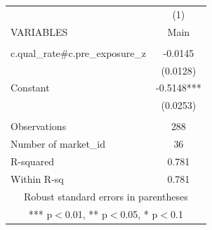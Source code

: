 \begin{tabular}{lc} \hline
 & (1) \\
VARIABLES & Main \\ \hline
 &  \\
c.qual\_rate\#c.pre\_exposure\_z & -0.0145 \\
 & (0.0128) \\
Constant & -0.5148*** \\
 & (0.0253) \\
 &  \\
Observations & 288 \\
Number of market\_id & 36 \\
R-squared & 0.781 \\
 Within R-sq & 0.781 \\ \hline
\multicolumn{2}{c}{ Robust standard errors in parentheses} \\
\multicolumn{2}{c}{ *** p$<$0.01, ** p$<$0.05, * p$<$0.1} \\
\end{tabular}
